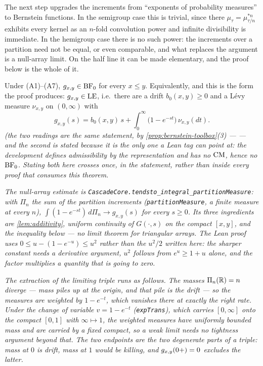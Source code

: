 \bigskip

The next step upgrades the increments from ``exponents of probability measures'' to Bernstein
functions. In the semigroup case this is trivial, since there $\mu_\tau = \mu_{\tau/n}^{*n}$
exhibits every kernel as an $n$-fold convolution power and infinite divisibility is immediate.
In the hemigroup case there is no such power: the increments over a partition need not be
equal, or even comparable, and what replaces the argument is a null-array limit. On the half
line it can be made elementary, and the proof below is the whole of it.

\begin{theorem}\label{thm:increments-bernstein}
\leanok
Under (A1)--(A7), $g_{x,y} \in \mathrm{BF}_0$ for every $x \le y$. Equivalently, and this is the form the
proof produces: $g_{x,y} \in \mathrm{LE}$, i.e.\ there are a drift $b_0(x,y) \ge 0$ and a Lévy measure
$\nu_{x,y}$ on $(0,\infty)$ with
\[
  g_{x,y}(s) = b_0(x,y)\,s + \int_0^\infty \bigl(1 - e^{-st}\bigr)\,\nu_{x,y}(dt).
\]
\statusT\quad\emph{(the two readings are the same statement, by
\ref{prop:bernstein-toolbox}(3) ---  --- and the second is stated because it is the
only one a Lean tag can point at: the development defines admissibility by the representation
and has no $\mathrm{CM}$, hence no $\mathrm{BF}_0$. Stating both here crosses  once, in the
statement, rather than inside every proof that consumes this theorem.}

\emph{The null-array estimate is
\texttt{CascadeCore.tendsto\_integral\_partition\-Measure}: with $\Pi_n$ the sum of the
partition increments (\texttt{partitionMeasure}, a finite measure at every $n$),
$\int (1 - e^{-st})\,d\Pi_n \to g_{x,y}(s)$ for every $s \ge 0$. Its three ingredients are
\ref{lem:additivity}, uniform continuity of $G(\cdot,s)$ on the compact $[x,y]$, and the
inequality below --- no limit theorem for triangular arrays. The Lean proof uses
$0 \le u - (1 - e^{-u}) \le u^2$ rather than the $u^2/2$ written here: the sharper constant
needs a derivative argument, $u^2$ follows from $e^u \ge 1 + u$ alone, and the factor multiplies
a quantity that is going to zero.}

\emph{The extraction of the limiting triple runs as follows. The masses
$\Pi_n(\mathbb{R}) = n$ diverge --- mass piles up at the origin, and that pile \emph{is} the drift ---
so the measures are weighted by $1 - e^{-t}$, which vanishes there at exactly the right rate.
Under the change of variable $v = 1 - e^{-t}$ (\texttt{expTrans}), which carries $[0,\infty]$
onto the compact $[0,1]$ with $\infty \mapsto 1$, the weighted measures have uniformly bounded
mass and are carried by a fixed compact, so a weak limit needs no tightness argument beyond
that. The two endpoints are the two degenerate parts of a triple: mass at $0$ is drift, mass at
$1$ would be killing, and $g_{x,y}(0{+}) = 0$ excludes the latter.}


\end{theorem}
